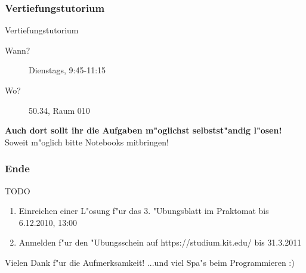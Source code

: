 \documentclass{beamer}
\begin{document}
\begin{frame}
\frametitle{Vertiefungstutorium}
\begin{block}{Vertiefungstutorium}
\begin{description}
\item[Wann?] Dienstags, 9:45-11:15
\item[Wo?] 50.34, Raum 010
\end{description}
\textbf{Auch dort sollt ihr die Aufgaben m"oglichst selbstst"andig l"osen!}
\alert{Soweit m"oglich bitte Notebooks mitbringen!}
\end{block}
\end{frame}


\begin{frame}
\frametitle{Ende}
\begin{block}{TODO}
\begin{enumerate}
\item Einreichen einer L"osung f"ur das 3. "Ubungsblatt im Praktomat bis \alert{6.12.2010, 13:00}
\item Anmelden f"ur den "Ubungsschein auf https://studium.kit.edu/ bis \alert{31.3.2011}
\end{enumerate}
\end{block}

\begin{block}{Vielen Dank f"ur die Aufmerksamkeit!}
...und viel Spa"s beim Programmieren :)
\end{block}
\end{frame}
\end{document}
